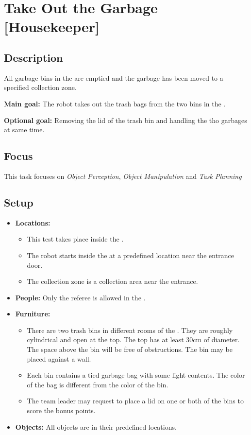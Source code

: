 \section{Take Out the Garbage [Housekeeper]}
\label{test:take-out-the-garbage}

\subsection*{Description}
	All garbage bins in the \Arena{} are emptied and the garbage has been moved to a specified collection zone.

\textbf{Main goal:}
	The robot takes out the trash bags from the two bins in the \Arena{}.

\textbf{Optional goal:}
	Removing the lid of the trash bin and handling the tho garbages at same time.

\subsection*{Focus}
	This task focuses on 
	\textit{Object Perception},
	\textit{Object Manipulation} and
	\textit{Task Planning}

\subsection*{Setup}
\begin{itemize}[nosep]	
	\item \textbf{Locations:}
		\begin{itemize}
			\item This test takes place inside the \Arena{}.
			\item The robot starts inside the \Arena{} at a predefined location near the entrance door.
			\item The collection zone is a collection area near the entrance.
		\end{itemize}
	\item \textbf{People:} Only the referee is allowed in the \Arena{}.
	\item \textbf{Furniture:} 
		\begin{itemize}
			\item There are two trash bins in different rooms of the \Arena{}. They are roughly cylindrical and open at the top. The top has at least 30cm of diameter. The space above the bin will be free of obstructions. The bin may be placed against a wall.
			\item Each bin contains a tied garbage bag with some light contents. The color of the bag is different from the color of the bin.
			\item The team leader may request to place a lid on one or both of the bins to score the bonus points.
		\end{itemize}
	\item \textbf{Objects:} All objects are in their predefined locations.
\end{itemize}

